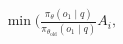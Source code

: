 \documentclass[preview]{standalone}
\begin{document}
\begin{align*}
\min \big(\frac{\pi_\theta(o_1 \mid q)}{\pi_{\theta_{\text{old}}}(o_1 \mid q)} A_i,
\end{align*}
\end{document}

